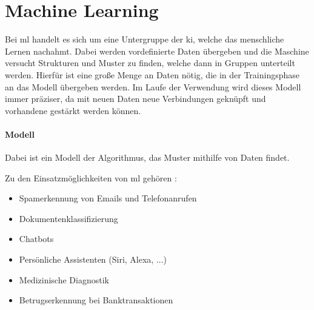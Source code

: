 \section{Machine Learning}

Bei \gls{ml} handelt es sich um eine Untergruppe der \gls{ki}, welche das menschliche Lernen nachahmt. Dabei werden vordefinierte Daten übergeben und die Maschine versucht Strukturen und Muster zu finden, welche dann in Gruppen unterteilt werden. Hierfür ist eine große Menge an Daten nötig, die in der Trainingsphase an das Modell übergeben werden. Im Laufe der Verwendung wird dieses Modell immer präziser, da mit neuen Daten neue Verbindungen geknüpft und vorhandene gestärkt werden können.

\paragraph{Modell} Dabei ist ein Modell der Algorithmus, das Muster mithilfe von Daten findet.

Zu den Einsatzmöglichkeiten von \gls{ml} gehören \cite{MLU}:

\begin{itemize}
    \item Spamerkennung von Emails und Telefonanrufen
    \item Dokumentenklassifizierung
    \item Chatbots
    \item Persönliche Assistenten (Siri, Alexa, ...)
    \item Medizinische Diagnostik
    \item Betrugserkennung bei Banktransaktionen
\end{itemize}












